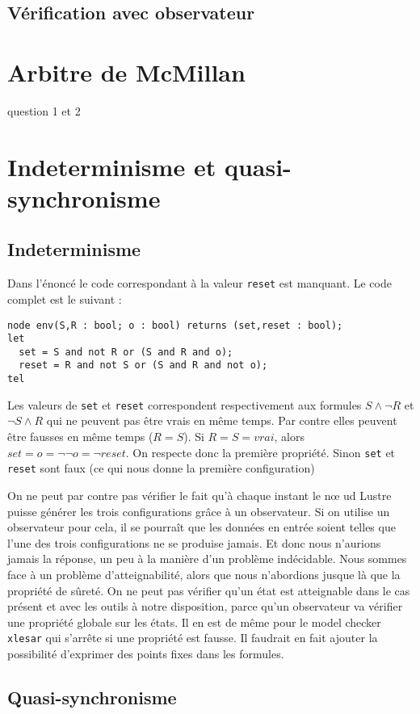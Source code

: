 \documentclass[a4paper]{article}
\begin{document}
\subsection{Vérification avec observateur}

\section{Arbitre de McMillan}
question 1 et 2
\section{Indeterminisme et quasi-synchronisme}

\subsection{Indeterminisme}

Dans l'énoncé le code correspondant à la valeur \texttt{reset} est
manquant. Le code complet est le suivant :

\begin{verbatim}
node env(S,R : bool; o : bool) returns (set,reset : bool);
let
  set = S and not R or (S and R and o);
  reset = R and not S or (S and R and not o);
tel
\end{verbatim}

Les valeurs de \texttt{set} et \texttt{reset} correspondent
respectivement aux formules $S \wedge \neg R$ et $\neg S \wedge R$ qui
ne peuvent pas être vrais en même temps. Par contre elles peuvent être
fausses en même temps ($R = S$). Si $R = S = vrai$, alors $set = o = \neg
\neg o = \neg reset$. On respecte donc la première
propriété. Sinon \texttt{set} et \texttt{reset} sont faux
(ce qui nous donne la première configuration)

On ne peut par contre pas vérifier le fait qu'à chaque instant le n\oe
ud Lustre puisse générer les trois configurations grâce à un
observateur. Si on utilise un observateur pour cela, il se pourraît que
les données en entrée soient telles que l'une des trois configurations
ne se produise jamais. Et donc nous n'aurions jamais la réponse, un
peu à la manière d'un problème indécidable. Nous sommes face à un problème
d'atteignabilité, alors que nous n'abordions jusque là que la propriété de
sûreté. On ne peut pas vérifier qu'un état est atteignable
dans le cas présent et avec les outils à notre disposition, parce
qu'un observateur va vérifier une propriété globale sur les états. Il
en est de même pour le model checker \texttt{xlesar} qui s'arrête si
une propriété est fausse. Il faudrait en fait ajouter la possibilité
d'exprimer des points fixes dans les formules.

\subsection{Quasi-synchronisme}
\end{document}
